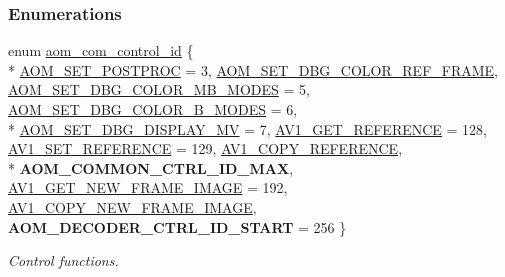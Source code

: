 \subsubsection*{Enumerations}
\begin{DoxyCompactItemize}
\item 
enum \hyperlink{group__aom_ga9421a1fa78c0d9587ae5aa6c1cb3d659}{aom\+\_\+com\+\_\+control\+\_\+id} \{ \\*
\hyperlink{group__aom_gga9421a1fa78c0d9587ae5aa6c1cb3d659a38a077f5bce4e82d137ec1825b926b47}{A\+O\+M\+\_\+\+S\+E\+T\+\_\+\+P\+O\+S\+T\+P\+R\+OC} = 3, 
\hyperlink{group__aom_gga9421a1fa78c0d9587ae5aa6c1cb3d659a92b2ba27f46b7c3c2e2ad7aabf65750a}{A\+O\+M\+\_\+\+S\+E\+T\+\_\+\+D\+B\+G\+\_\+\+C\+O\+L\+O\+R\+\_\+\+R\+E\+F\+\_\+\+F\+R\+A\+ME}, 
\hyperlink{group__aom_gga9421a1fa78c0d9587ae5aa6c1cb3d659af103c902305c536a783f27b2afe7347d}{A\+O\+M\+\_\+\+S\+E\+T\+\_\+\+D\+B\+G\+\_\+\+C\+O\+L\+O\+R\+\_\+\+M\+B\+\_\+\+M\+O\+D\+ES} = 5, 
\hyperlink{group__aom_gga9421a1fa78c0d9587ae5aa6c1cb3d659a95f41ff924fa77edb66ea2c1ed780942}{A\+O\+M\+\_\+\+S\+E\+T\+\_\+\+D\+B\+G\+\_\+\+C\+O\+L\+O\+R\+\_\+\+B\+\_\+\+M\+O\+D\+ES} = 6, 
\\*
\hyperlink{group__aom_gga9421a1fa78c0d9587ae5aa6c1cb3d659af7eb68ae889b8ba8eca2b3c2a7db0a47}{A\+O\+M\+\_\+\+S\+E\+T\+\_\+\+D\+B\+G\+\_\+\+D\+I\+S\+P\+L\+A\+Y\+\_\+\+MV} = 7, 
\hyperlink{group__aom_gga9421a1fa78c0d9587ae5aa6c1cb3d659a4b8bcdaae4f4ff2e78d2e9d53090e13b}{A\+V1\+\_\+\+G\+E\+T\+\_\+\+R\+E\+F\+E\+R\+E\+N\+CE} = 128, 
\hyperlink{group__aom_gga9421a1fa78c0d9587ae5aa6c1cb3d659a51ad4467b4dc318406cceb257e2daa41}{A\+V1\+\_\+\+S\+E\+T\+\_\+\+R\+E\+F\+E\+R\+E\+N\+CE} = 129, 
\hyperlink{group__aom_gga9421a1fa78c0d9587ae5aa6c1cb3d659af5c56c3dbccf31fca7621e8327ba7354}{A\+V1\+\_\+\+C\+O\+P\+Y\+\_\+\+R\+E\+F\+E\+R\+E\+N\+CE}, 
\\*
{\bfseries A\+O\+M\+\_\+\+C\+O\+M\+M\+O\+N\+\_\+\+C\+T\+R\+L\+\_\+\+I\+D\+\_\+\+M\+AX}, 
\hyperlink{group__aom_gga9421a1fa78c0d9587ae5aa6c1cb3d659a410c706a34f5295996658cc5044a700f}{A\+V1\+\_\+\+G\+E\+T\+\_\+\+N\+E\+W\+\_\+\+F\+R\+A\+M\+E\+\_\+\+I\+M\+A\+GE} = 192, 
\hyperlink{group__aom_gga9421a1fa78c0d9587ae5aa6c1cb3d659ae41763622ee33cd99e23ca8f78a3f8fa}{A\+V1\+\_\+\+C\+O\+P\+Y\+\_\+\+N\+E\+W\+\_\+\+F\+R\+A\+M\+E\+\_\+\+I\+M\+A\+GE}, 
{\bfseries A\+O\+M\+\_\+\+D\+E\+C\+O\+D\+E\+R\+\_\+\+C\+T\+R\+L\+\_\+\+I\+D\+\_\+\+S\+T\+A\+RT} = 256
 \}\begin{DoxyCompactList}\small\item\em Control functions. \end{DoxyCompactList}

\end{DoxyCompactItemize}
